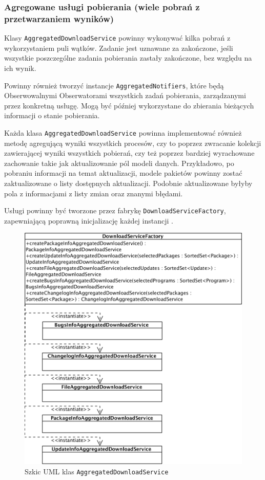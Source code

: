 \documentclass[polish,12pt,titlepage]{article}
\begin{document}
\subsubsection{Agregowane usługi pobierania (wiele pobrań z przetwarzaniem wyników)}

Klasy \texttt{AggregatedDownloadService} powinny wykonywać kilka pobrań z
wykorzystaniem puli wątków. Zadanie jest uznawane za zakończone, jeśli
wszystkie poszczególne zadania pobierania zastały zakończone, bez względu
na ich wynik.

Powinny również tworzyć instancje \texttt{AggregatedNotifiers}, które będą
Obserwowalnymi Obserwatorami \cite{OBSERWATOR} wszystkich zadań pobierania,
zarządzanymi przez konkretną usługę. Mogą być później wykorzystane do
zbierania bieżących informacji o stanie pobierania.

Każda klasa \texttt{AggregatedDownloadService} powinna implementować również
metodę agregującą wyniki wszystkich procesów, czy to poprzez zwracanie
kolekcji zawierającej wyniki wszystkich pobierań, czy też poprzez bardziej
wyrachowane zachowanie takie jak aktualizowanie pól modeli danych.
Przykładowo, po pobraniu informacji na temat aktualizacji, modele pakietów
powinny zostać zaktualizowane o listy dostępnych aktualizacji. Podobnie
aktualizowane byłyby pola z informacjami z listy zmian oraz znanymi błędami.

Usługi powinny być tworzone przez fabrykę \texttt{DownloadServiceFactory},
zapewniającą poprawną inicjalizację każdej instancji
\cite{FABRYKA_ABSTRAKCYJNA}.

\begin{figure}[!ht]
\centering
\includegraphics[bb=0 0 983 1043, scale=0.40]{AggregatedDownloadServices.png}
\caption{Szkic UML klas \texttt{AggregatedDownloadService}}
\end{figure}
\end{document}

